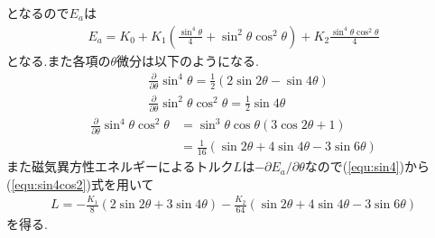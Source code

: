 となるので$E_a$は
\begin{align}
  E_a=K_0+K_1\left(\frac{\sin^4\theta}{4}+\sin^2\theta\cos^2\theta\right)+K_2\frac{\sin^4\theta\cos^2\theta}{4}
\end{align}
となる.また各項の$\theta$微分は以下のようになる.
\begin{align}
  \label{equ:sin4}
  &\frac{\partial}{\partial\theta}\sin^4\theta=\frac{1}{2}(2\sin2\theta-\sin4\theta)\\
  \label{equ:sin2cos2}
  &\frac{\partial}{\partial\theta}\sin^2\theta\cos^2\theta=\frac{1}{2}\sin4\theta
\end{align}
\begin{align}
  \label{equ:sin4cos2}
  \frac{\partial}{\partial\theta}\sin^4\theta\cos^2\theta&=\sin^3\theta\cos\theta(3\cos2\theta+1)\nonumber\\
  &=\frac{1}{16}(\sin2\theta+4\sin4\theta-3\sin6\theta)
\end{align}
また磁気異方性エネルギーによるトルク$L$は$-\partial E_a/\partial \theta$なので(\ref{equ:sin4})から(\ref{equ:sin4cos2})式を用いて
\begin{align}
  \label{equ:K_theory}
  L=-\frac{K_1}{8}(2\sin2\theta+3\sin4\theta)-\frac{K_2}{64}(\sin2\theta+4\sin4\theta-3\sin6\theta)
\end{align}
を得る.
